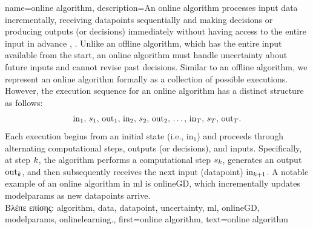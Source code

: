 {name={online algorithm},
	description={An online \gls{algorithm} processes input \gls{data} incrementally, 
		receiving \gls{datapoint}s sequentially and making decisions or producing outputs (or decisions) immediately 
		without having access to the entire input in advance \cite{PredictionLearningGames}, \cite{HazanOCO}. 
		Unlike an offline \gls{algorithm}, which has the entire input available from the start, an online \gls{algorithm} 
		must handle \gls{uncertainty} about future inputs and cannot revise past decisions. Similar to an 
		offline \gls{algorithm}, we represent an online \gls{algorithm} formally as a collection of possible 
		executions. However, the execution sequence for an online \gls{algorithm} has a distinct structure as follows:
		$${\rm in}_{1}, \,s_1, \,{\rm out}_{1}, \,{\rm in}_{2}, \,s_2, \,{\rm out}_{2}, \,\ldots, \,{\rm in}_{T}, \,s_T, \,{\rm out}_{T}.$$ 
		Each execution begins from an initial state (i.e., \(\text{in}_{1}\)) and proceeds through alternating 
		computational steps, outputs (or decisions), and inputs. Specifically, at step \(k\), 
		the \gls{algorithm} performs a computational step \(s_{k}\), generates an output \(\text{out}_{k}\), 
		and then subsequently receives the next input (\gls{datapoint}) \(\text{in}_{k+1}\). A 
		notable example of an online \gls{algorithm} in \gls{ml} is \gls{onlineGD}, which incrementally 
		updates \gls{modelparams} as new \gls{datapoint}s arrive. 
					\\ 
		\foreignlanguage{greek}{Βλέπε επίσης:} \gls{algorithm}, \gls{data}, \gls{datapoint}, \gls{uncertainty}, \gls{ml}, 
		\gls{onlineGD}, \gls{modelparams}, \gls{onlinelearning}.},
	first={online algorithm},
	text={online algorithm} 
}

\newcommand{\gaussiancenter}{3}

